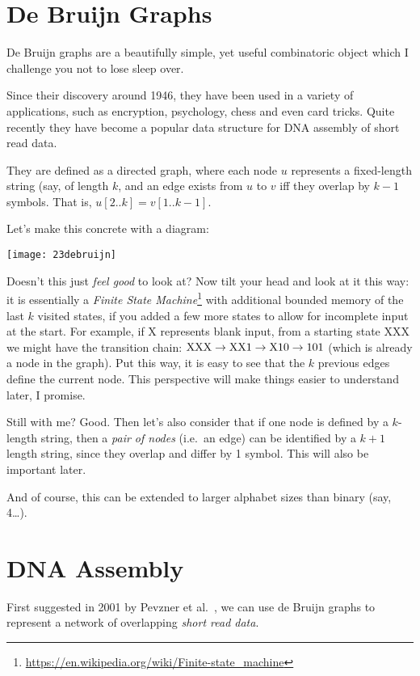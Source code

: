\section{De Bruijn Graphs}\label{bl-sec:dbg}

De Bruijn graphs are a beautifully simple, yet useful combinatoric object which I challenge you not to lose sleep over.

Since their discovery around 1946, they have been used in a variety of applications, such as encryption, psychology, chess and even card tricks. Quite recently they have become a popular data structure for DNA assembly of short read data.

They are defined as a directed graph, where each node $u$ represents a fixed-length string (say, of length $k$, and an edge exists from $u$ to $v$ iff they overlap by $k-1$ symbols. That is, $u[2..k]=v[1..k-1]$.

Let's make this concrete with a diagram:

\medskip\centerline{\texttt{[image: 23debruijn]}}\medskip

Doesn't this just \emph{feel good} to look at? Now tilt your head and look at it this way: it is essentially a \emph{Finite State Machine}\footnote{\url{https://en.wikipedia.org/wiki/Finite-state_machine}} with additional bounded memory of the last $k$ visited states, if you added a few more states to allow for incomplete input at the start. For example, if X represents blank input, from a starting state XXX we might have the transition chain: $\rm XXX \to XX1 \to X10 \to 101$ (which is already a node in the graph). Put this way, it is easy to see that the $k$ previous edges define the current node. This perspective will make things easier to understand later, I promise.

Still with me? Good. Then let's also consider that if one node is defined by a $k$-length string, then a \emph{pair of nodes} (i.e.\ an edge) can be identified by a $k+1$ length string, since they overlap and differ by 1 symbol. This will also be important later.

And of course, this can be extended to larger alphabet sizes than binary (say, 4\ldots).

\section{DNA Assembly}\label{bl-sec:dna}

First suggested in 2001 by Pevzner et al.~\cite{PevTan01}, we can use de Bruijn graphs to represent a network of overlapping \emph{short read data}.

